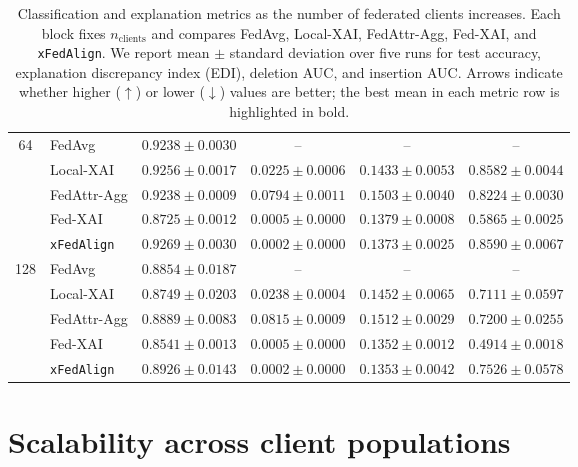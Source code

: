 \documentclass{article}
\theoremstyle{plain}
\theoremstyle{definition}
\theoremstyle{remark}
\begin{document}
\begin{table}[t]
\begin{tabular}{clcccc}
    \multirow{5}{*}{64}
      & FedAvg        & $0.9238 \pm 0.0030$ & --                      & --                      & --                      \\
      & Local-XAI   & $0.9256 \pm 0.0017$ & $0.0225 \pm 0.0006$       & $0.1433 \pm 0.0053$       & $0.8582 \pm 0.0044$       \\
      & FedAttr-Agg & $0.9238 \pm 0.0009$ & $0.0794 \pm 0.0011$       & $0.1503 \pm 0.0040$       & $0.8224 \pm 0.0030$       \\
      & Fed-XAI     & $0.8725 \pm 0.0012$ & $0.0005 \pm 0.0000$       & $0.1379 \pm 0.0008$       & $0.5865 \pm 0.0025$       \\
      & \texttt{xFedAlign}      & $\mathbf{0.9269} \pm 0.0030$ & $\mathbf{0.0002} \pm 0.0000$ & $\mathbf{0.1373} \pm 0.0025$ & $\mathbf{0.8590} \pm 0.0067$ \\
    \midrule

    \multirow{5}{*}{128}
      & FedAvg        & $0.8854 \pm 0.0187$ & --                      & --                      & --                      \\
      & Local-XAI   & $0.8749 \pm 0.0203$ & $0.0238 \pm 0.0004$       & $0.1452 \pm 0.0065$       & $0.7111 \pm 0.0597$       \\
      & FedAttr-Agg & $0.8889 \pm 0.0083$ & $0.0815 \pm 0.0009$       & $0.1512 \pm 0.0029$       & $0.7200 \pm 0.0255$       \\
      & Fed-XAI     & $0.8541 \pm 0.0013$ & $0.0005 \pm 0.0000$       & $\mathbf{0.1352} \pm 0.0012$ & $0.4914 \pm 0.0018$       \\
      & \texttt{xFedAlign}      & $\mathbf{0.8926} \pm 0.0143$ & $\mathbf{0.0002} \pm 0.0000$ & $0.1353 \pm 0.0042$       & $\mathbf{0.7526} \pm 0.0578$ \\
    \bottomrule
  \end{tabular}
  \caption{
     Classification and explanation metrics as the number of federated clients increases.
    Each block fixes $n_{\text{clients}}$ and compares FedAvg, Local-XAI,
    FedAttr-Agg, Fed-XAI, and \texttt{xFedAlign}.
    We report mean $\pm$ standard deviation over five runs for test accuracy, explanation discrepancy index (EDI),
    deletion AUC, and insertion AUC. Arrows indicate whether higher ($\uparrow$) or lower ($\downarrow$)
    values are better; the best mean in each metric row is highlighted in bold.
  }
  \label{tab:mnist_clients_sweep_rows_methods}
\end{table}

\section{Scalability across client populations}
\label{app:scalability-clients}
\end{document}
